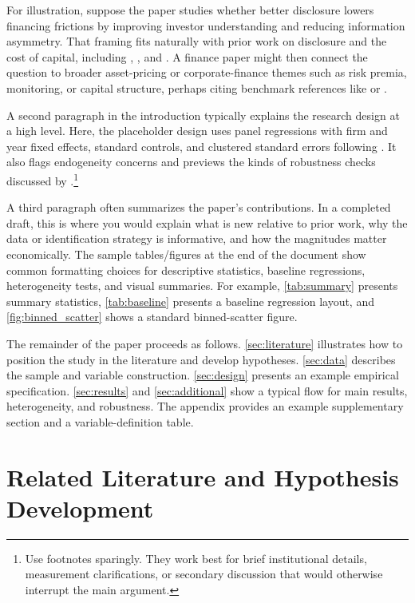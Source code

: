 \documentclass[hidelinks,12pt]{article}
\begin{document}
For illustration, suppose the paper studies whether better disclosure lowers financing frictions by improving investor understanding and reducing information asymmetry. That framing fits naturally with prior work on disclosure and the cost of capital, including \citet{botosan1997disclosure}, \citet{healy2001information}, and \citet{lambert2007accounting}. A finance paper might then connect the question to broader asset-pricing or corporate-finance themes such as risk premia, monitoring, or capital structure, perhaps citing benchmark references like \citet{fama1993common} or \citet{jensen1976theory}.

A second paragraph in the introduction typically explains the research design at a high level. Here, the placeholder design uses panel regressions with firm and year fixed effects, standard controls, and clustered standard errors following \citet{petersen2009estimating}. It also flags endogeneity concerns and previews the kinds of robustness checks discussed by \citet{angrist2009mostly}.\footnote{Use footnotes sparingly. They work best for brief institutional details, measurement clarifications, or secondary discussion that would otherwise interrupt the main argument.}

A third paragraph often summarizes the paper's contributions. In a completed draft, this is where you would explain what is new relative to prior work, why the data or identification strategy is informative, and how the magnitudes matter economically. The sample tables/figures at the end of the document show common formatting choices for descriptive statistics, baseline regressions, heterogeneity tests, and visual summaries. For example, \autoref{tab:summary} presents summary statistics, \autoref{tab:baseline} presents a baseline regression layout, and \autoref{fig:binned_scatter} shows a standard binned-scatter figure.

The remainder of the paper proceeds as follows. \autoref{sec:literature} illustrates how to position the study in the literature and develop hypotheses. \autoref{sec:data} describes the sample and variable construction. \autoref{sec:design} presents an example empirical specification. \autoref{sec:results} and \autoref{sec:additional} show a typical flow for main results, heterogeneity, and robustness. The appendix provides an example supplementary section and a variable-definition table.

\section{Related Literature and Hypothesis Development}
\label{sec:literature}
\end{document}
